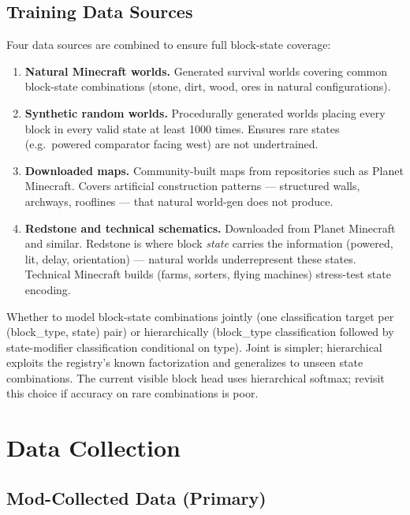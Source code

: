 \documentclass[11pt,a4paper]{article}
\begin{document}
\subsection{Training Data Sources}

Four data sources are combined to ensure full block-state coverage:

\begin{enumerate}
  \item \textbf{Natural Minecraft worlds.} Generated survival worlds covering common block-state combinations (stone, dirt, wood, ores in natural configurations).
  \item \textbf{Synthetic random worlds.} Procedurally generated worlds placing every block in every valid state at least 1000 times. Ensures rare states (e.g.\ powered comparator facing west) are not undertrained.
  \item \textbf{Downloaded maps.} Community-built maps from repositories such as Planet Minecraft. Covers artificial construction patterns --- structured walls, archways, rooflines --- that natural world-gen does not produce.
  \item \textbf{Redstone and technical schematics.} Downloaded from Planet Minecraft and similar. Redstone is where block \textit{state} carries the information (powered, lit, delay, orientation) --- natural worlds underrepresent these states. Technical Minecraft builds (farms, sorters, flying machines) stress-test state encoding.
\end{enumerate}

\begin{openquestion}
Whether to model block-state combinations jointly (one classification target per (block\_type, state) pair) or hierarchically (block\_type classification followed by state-modifier classification conditional on type). Joint is simpler; hierarchical exploits the registry's known factorization and generalizes to unseen state combinations. The current visible block head uses hierarchical softmax; revisit this choice if accuracy on rare combinations is poor.
\end{openquestion}

\section{Data Collection}

\subsection{Mod-Collected Data (Primary)}
\end{document}
